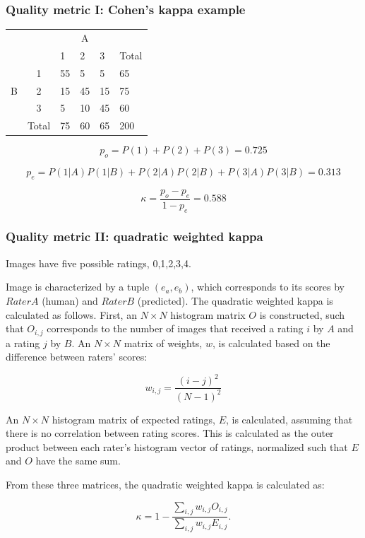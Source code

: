\begin{frame}\frametitle{Quality metric I: Cohen's kappa example}
\footnotesize
\begin{table}[]
\centering
\begin{tabular}{c|c|l|l|l|l}
\cline{3-5}
\multicolumn{2}{l|}{\multirow{2}{*}{}}           & \multicolumn{3}{c|}{A} &                            \\ \cline{3-6} 
\multicolumn{2}{l|}{}                            & 1      & 2     & 3     & \multicolumn{1}{l|}{Total} \\ \hline
\multicolumn{1}{|c|}{\multirow{3}{*}{B}} & 1     & 55     & 5     & 5     & \multicolumn{1}{l|}{65}    \\ \cline{2-6} 
\multicolumn{1}{|c|}{}                   & 2     & 15     & 45    & 15    & \multicolumn{1}{l|}{75}    \\ \cline{2-6} 
\multicolumn{1}{|c|}{}                   & 3     & 5      & 10    & 45    & \multicolumn{1}{l|}{60}    \\ \hline
                                         & Total & 75     & 60    & 65    & \multicolumn{1}{l|}{200}   \\ \cline{2-6} 
\end{tabular}
\end{table}

\par \[ p_o = P(1)+P(2)+P(3) = 0.725 \]
\par \[ p_e = P(1|A)P(1|B)+P(2|A)P(2|B)+P(3|A)P(3|B) = 0.313 \]
\par \[ \kappa = \frac{p_o - p_e}{1 - p_e} = 0.588 \]

\end{frame}

\begin{frame}\frametitle{Quality metric II: quadratic weighted kappa} 
\footnotesize { %
\par Images have five possible ratings, 0,1,2,3,4. 
\par Image is characterized by a tuple $ (e_a,e_b) $, which corresponds to its scores by $Rater A$ (human) and $Rater B$ (predicted).  The quadratic weighted kappa is calculated as follows. First, an $N\times N$ histogram matrix $O$ is constructed, such that $O_{i,j}$ corresponds to the number of images that received a rating $i$ by $A$ and a rating $j$ by $B$. An $N\times N$ matrix of weights, $w$, is calculated based on the difference between raters' scores:

\[ w_{i,j} = \frac{\left(i-j\right)^2}{\left(N-1\right)^2} \]

An $N\times N$ histogram matrix of expected ratings, $E$, is calculated, assuming that there is no correlation between rating scores.  This is calculated as the outer product between each rater's histogram vector of ratings, normalized such that $E$ and $O$ have the same sum.

From these three matrices, the quadratic weighted kappa is calculated as: 

\[ \kappa=1-\frac{\sum_{i,j}w_{i,j}O_{i,j}}{\sum_{i,j}w_{i,j}E_{i,j}}. \]
}

\end{frame}

